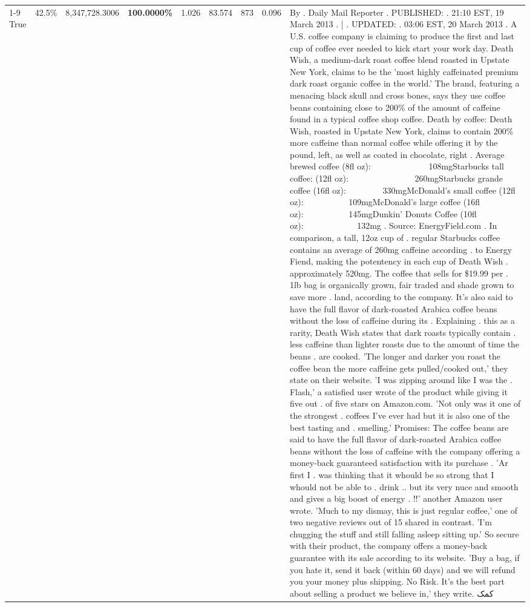 \begin{table}[H]
{\begin{tabular}{lllrlllll}
\cline{1-9} \cline{2-9}
True & 42.5\% & 8,347,728.3006 & \bfseries \color{red} 100.0000\% & 1.026 & 83.574 & 873 & 0.096 & By . Daily Mail Reporter . PUBLISHED: . 21:10 EST, 19 March 2013 . | . UPDATED: . 03:06 EST, 20 March 2013 . A U.S. coffee company is claiming to produce the first and last cup of coffee ever needed to kick start your work day. Death Wish, a medium-dark roast coffee blend roasted in Upstate New York, claims to be the 'most highly caffeinated premium dark roast organic coffee in the world.' The brand, featuring a menacing black skull and cross bones, says they use coffee beans containing close to 200\% of the amount of caffeine found in a typical coffee shop coffee. Death by coffee: Death Wish, roasted in Upstate New York, claims to contain 200\% more caffeine than normal coffee while offering it by the pound, left, as well as coated in chocolate, right . Average brewed coffee (8fl oz):              108mgStarbucks tall coffee: (12fl oz):                260mgStarbucks grande coffee (16fl oz):         330mgMcDonald's small coffee (12fl oz):           109mgMcDonald's large coffee (16fl oz):           145mgDunkin' Donuts Coffee (10fl oz):             132mg . Source: EnergyField.com . In comparison, a tall, 12oz cup of . regular Starbucks coffee contains an average of 260mg caffeine according . to Energy Fiend, making the potentency in each cup of Death Wish . approximately 520mg. The coffee that sells for \$19.99 per . 1lb bag is organically grown, fair traded and shade grown to save more . land, according to the company. It's also said to have the full flavor of dark-roasted Arabica coffee beans without the loss of caffeine during its . Explaining . this as a rarity, Death Wish states that dark roasts typically contain . less caffeine than lighter roasts due to the amount of time the beans . are cooked. 'The longer and darker you roast the coffee bean the more caffeine gets pulled/cooked out,' they state on their website. 'I was zipping around like I was the . Flash,' a satisfied user wrote of the product while giving it five out . of five stars on Amazon.com. 'Not only was it one of the strongest . coffees I've ever had but it is also one of the best tasting and . smelling.’ Promises: The coffee beans are said to have the full flavor of dark-roasted Arabica coffee beans without the loss of caffeine with the company offering a money-back guaranteed satisfaction with its purchase . 'Ar first I . was thinking that it whould be so strong that I whould not be able to . drink .. but its very nuce and smooth and gives a big boost of energy . !!' another Amazon user wrote. 'Much to my dismay, this is just regular coffee,' one of two negative reviews out of 15 shared in contrast. 'I'm chugging the stuff and still falling asleep sitting up.' So secure with their product, the company offers a money-back guarantee with its sale according to its website. 'Buy a bag, if you hate it, send it back (within 60 days) and we will refund you your money plus shipping. No Risk. It’s the best part about selling a product we believe in,' they write. کمک \\

\end{tabular}}
\end{table}

